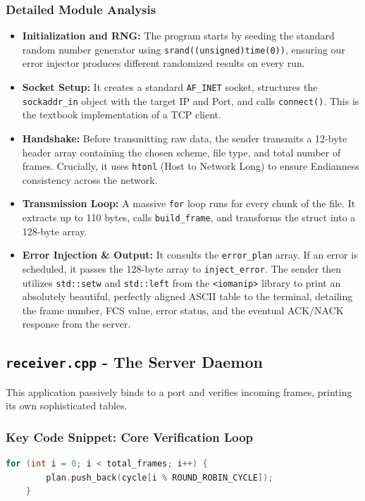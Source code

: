 \documentclass[12pt, a4paper]{article}
\begin{document}
\subsubsection{Detailed Module Analysis}
\begin{itemize}
    \item \textbf{Initialization and RNG:} The program starts by seeding the standard random number generator using \texttt{srand((unsigned)time(0))}, ensuring our error injector produces different randomized results on every run.
    \item \textbf{Socket Setup:} It creates a standard \texttt{AF\_INET} socket, structures the \texttt{sockaddr\_in} object with the target IP and Port, and calls \texttt{connect()}. This is the textbook implementation of a TCP client.
    \item \textbf{Handshake:} Before transmitting raw data, the sender transmits a 12-byte header array containing the chosen scheme, file type, and total number of frames. Crucially, it uses \texttt{htonl} (Host to Network Long) to ensure Endianness consistency across the network.
    \item \textbf{Transmission Loop:} A massive \texttt{for} loop runs for every chunk of the file. It extracts up to 110 bytes, calls \texttt{build\_frame}, and transforms the struct into a 128-byte array. 
    \item \textbf{Error Injection \& Output:} It consults the \texttt{error\_plan} array. If an error is scheduled, it passes the 128-byte array to \texttt{inject\_error}. The sender then utilizes \texttt{std::setw} and \texttt{std::left} from the \texttt{<iomanip>} library to print an absolutely beautiful, perfectly aligned ASCII table to the terminal, detailing the frame number, FCS value, error status, and the eventual ACK/NACK response from the server.
\end{itemize}

\subsection{\texttt{receiver.cpp} - The Server Daemon}
This application passively binds to a port and verifies incoming frames, printing its own sophisticated tables.

\subsubsection{Key Code Snippet: Core Verification Loop}
\begin{lstlisting}[language=C++]
for (int i = 0; i < total_frames; i++) {
        plan.push_back(cycle[i % ROUND_ROBIN_CYCLE]);
    }
\end{lstlisting}
\end{document}
